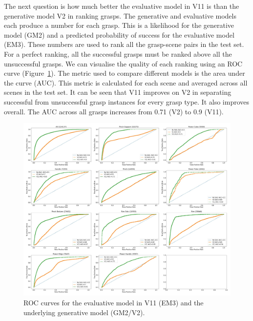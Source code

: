 The next question is how much better the evaluative model in V11 is than the generative model V2 in ranking grasps. The generative and evaluative models each produce a number for each grasp. This is a likelihood for the generative model (GM2) and a predicted probability of success for the evaluative model (EM3). These numbers are used to rank all the grasp-scene pairs in the test set. For a perfect ranking, all the successful grasps must be ranked above all the unsuccessful grasps. We can visualise the quality of each ranking using an ROC curve (Figure~\ref{fig:roc}). The metric used to compare different models is the area under the curve (AUC). This metric is calculated for each scene and averaged across all scenes in the test set. It can be seen that V11 improves on V2 in separating successful from unsuccessful grasp instances for every grasp type. It also improves overall. The AUC across all grasps increases from 0.71 (V2) to 0.9 (V11). 

\begin{figure}[h]
\centering
\includegraphics[width=1.0\columnwidth]{images/post-analysis/roc-analysis}
\caption{\label{fig:roc}ROC curves for the evaluative model in V11 (EM3) and the underlying generative model (GM2/V2).}
\end{figure}

